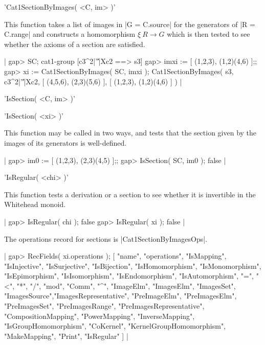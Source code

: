 %

'Cat1SectionByImages( <C, im> )'

This function  takes  a list  of  images in   |G =  C.source|  for the
generators of |R  = C.range| and constructs a  homomorphism  $\xi \: R
\to G$ which is then tested to see whether the axioms of a section are
satisfied.

|    gap> SC;
    cat1-group [c3^2|'\|'|Xc2 ==> s3] 
    gap> imxi := [ (1,2,3), (1,2)(4,6) ];;
    gap> xi := Cat1SectionByImages( SC, imxi );
    Cat1SectionByImages( s3, c3^2|'\|'|Xc2, [ (4,5,6), (2,3)(5,6) ], 
       [ (1,2,3), (1,2)(4,6) ] )  |

%

'IsSection( <C, im> )'

'IsSection( <xi> )'

This function may be  called in two  ways, and tests that  the section
given by the images of its generators is well-defined.

|    gap> im0 := [ (1,2,3), (2,3)(4,5) ];;
    gap> IsSection( SC, im0 );
    false   |

%

'IsRegular( <chi> )'

This function tests a  derivation or a  section  to see whether  it is
invertible in the Whitehead monoid.

|    gap> IsRegular( chi );
    false
    gap> IsRegular( xi );
    false  |

%

The operations record for sections is |Cat1SectionByImagesOps|.

|    gap> RecFields( xi.operations );
    [ "name", "operations", "IsMapping", "IsInjective", "IsSurjective", 
      "IsBijection", "IsHomomorphism", "IsMonomorphism", "IsEpimorphism", 
      "IsIsomorphism", "IsEndomorphism", "IsAutomorphism", "=", "<", "*",
      "/", "mod", "Comm", "^", "ImageElm", "ImagesElm", "ImagesSet",
      "ImagesSource","ImagesRepresentative", "PreImageElm", "PreImagesElm",
      "PreImagesSet", "PreImagesRange", "PreImagesRepresentative",
      "CompositionMapping", "PowerMapping", "InverseMapping",
      "IsGroupHomomorphism", "CoKernel", "KernelGroupHomomorphism",
      "MakeMapping", "Print", "IsRegular" ]  |

